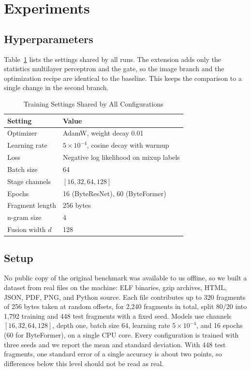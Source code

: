 \documentclass[journal]{IEEEtran}
\begin{document}
\section{Experiments}
\subsection{Hyperparameters}
Table~\ref{tab:hp} lists the settings shared by all runs. The extension adds only the statistics multilayer perceptron and the gate, so the image branch and the optimization recipe are identical to the baseline. This keeps the comparison to a single change in the second branch.

\begin{table}[t]
\caption{Training Settings Shared by All Configurations}
\label{tab:hp}
\centering
\begin{tabular}{ll}
\hline
Setting & Value \\
\hline
Optimizer & AdamW, weight decay 0.01 \\
Learning rate & $5\times10^{-4}$, cosine decay with warmup \\
Loss & Negative log likelihood on mixup labels \\
Batch size & 64 \\
Stage channels & $[16, 32, 64, 128]$ \\
Epochs & 16 (ByteResNet), 60 (ByteFormer) \\
Fragment length & 256 bytes \\
n-gram size & 4 \\
Fusion width $d$ & 128 \\
\hline
\end{tabular}
\end{table}

\subsection{Setup}
No public copy of the original benchmark was available to us offline, so we built a dataset from real files on the machine: ELF binaries, gzip archives, HTML, JSON, PDF, PNG, and Python source. Each file contributes up to 320 fragments of 256 bytes taken at random offsets, for 2,240 fragments in total, split 80/20 into 1,792 training and 448 test fragments with a fixed seed. Models use channels $[16,32,64,128]$, depth one, batch size 64, learning rate $5\times10^{-4}$, and 16 epochs (60 for ByteFormer), on a single CPU core. Every configuration is trained with three seeds and we report the mean and standard deviation. With 448 test fragments, one standard error of a single accuracy is about two points, so differences below this level should not be read as real.
\end{document}
